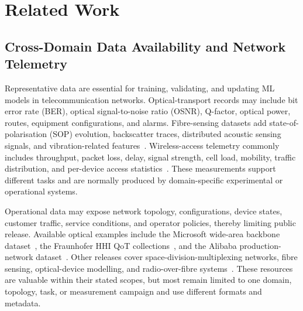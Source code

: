 \documentclass[9pt,twocolumn,twoside]{osajnl}
\begin{document}



\section{Related Work}

\subsection{Cross-Domain Data Availability and Network Telemetry}
 
Representative data are essential for training, validating, and updating ML models in telecommunication networks. Optical-transport records may include bit error rate (BER), optical signal-to-noise ratio (OSNR), Q-factor, optical power, routes, equipment configurations, and alarms. Fibre-sensing datasets add state-of-polarisation (SOP) evolution, backscatter traces, distributed acoustic sensing signals, and vibration-related features~\cite{he2023isac,zhao2025vibration,zhao2026train}. Wireless-access telemetry commonly includes throughput, packet loss, delay, signal strength, cell load, mobility, traffic distribution, and per-device access statistics~\cite{3gpp28552,etsi128554}. These measurements support different tasks and are normally produced by domain-specific experimental or operational systems.


Operational data may expose network topology, configurations, device states, customer traffic, service conditions, and operator policies, thereby limiting public release. Available optical examples include the Microsoft wide-area backbone dataset~\cite{filer2016microsoft,delezoide2020field}, the Fraunhofer HHI QoT collections~\cite{bergk2022qotdataset}, and the Alibaba production-network dataset~\cite{zhai2024alibaba,he2023qot}. Other releases cover space-division-multiplexing networks, fibre sensing, optical-device modelling, and radio-over-fibre systems~\cite{akbari2025sdmdatasets,li2026dasdataset,yuan2026soadataset,zhao2026mmwavearof}. These resources are valuable within their stated scopes, but most remain limited to one domain, topology, task, or measurement campaign and use different formats and metadata.
\end{document}
